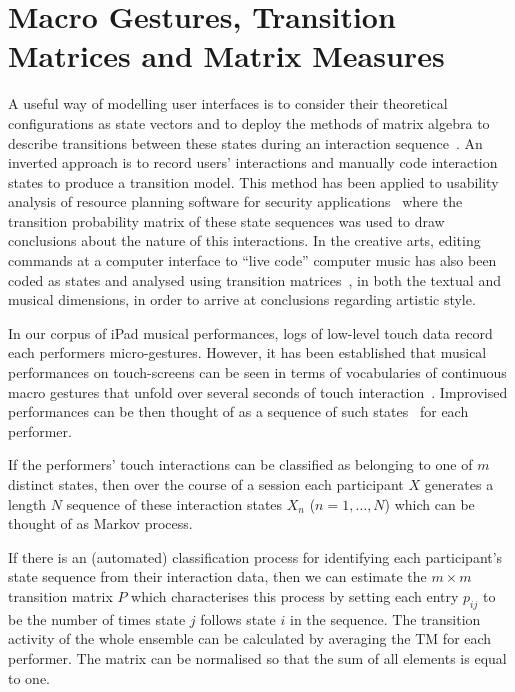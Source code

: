 \documentclass{sigchi}
\begin{document}
\section{Macro Gestures, Transition Matrices and Matrix Measures}

A useful way of modelling user interfaces is to consider their
theoretical configurations as state vectors and to deploy the methods
of matrix algebra to describe transitions between these states during
an interaction sequence~\cite{Thimbleby:2001kq, Thimbleby:2004fj}. An
inverted approach is to record users' interactions and manually code
interaction states to produce a transition model. This method has been
applied to usability analysis of resource planning software for
security applications~\cite{Kannampallil:2007fp} where the transition
probability matrix of these state sequences was used to draw
conclusions about the nature of this interactions. In the creative
arts, editing commands at a computer interface to ``live code''
computer music has also been coded as states and analysed using
transition matrices~\cite{Swift:2014tya}, in both the textual and
musical dimensions, in order to arrive at conclusions regarding
artistic style.

In our corpus of iPad musical performances, logs of low-level touch
data record each performers micro-gestures. However, it has been
established that musical performances on touch-screens can be seen in
terms of vocabularies of continuous macro gestures that unfold over
several seconds of touch interaction~\cite{Martin:2014cr}. Improvised
performances can be then thought of as a sequence of such
states~\cite{Pressing:1988uo} for each performer.

If the performers' touch interactions can be classified as belonging
to one of $m$ distinct states, then over the course of a session each
participant $X$ generates a length $N$ sequence of these interaction
states $X_n$ ($n = 1, \ldots, N$) which can be thought of as Markov
process.

If there is an (automated) classification process for identifying each
participant's state sequence from their interaction data, then we can
estimate the $m \times m$ transition matrix $P$ which characterises
this process by setting each entry $p_{ij}$ to be the number of times
state $j$ follows state $i$ in the sequence. The transition activity
of the whole ensemble can be calculated by averaging the TM for each
performer. The matrix can be normalised so that the sum of all
elements is equal to one.
\end{document}
